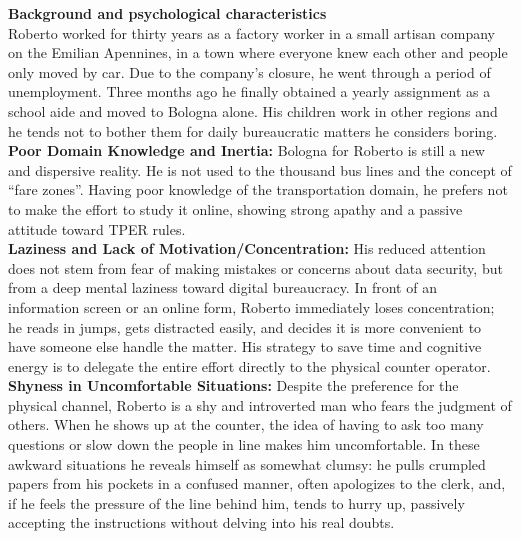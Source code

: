﻿\documentclass[11pt,a4paper]{article}
\begin{document}
\begin{tcolorbox}[base]
    \textbf{Background and psychological characteristics} \\[4pt]
    {\small
    Roberto worked for thirty years as a factory worker in a small artisan company on the Emilian Apennines, in a town where everyone knew each other and people only moved by car. Due to the company's closure, he went through a period of unemployment. Three months ago he finally obtained a yearly assignment as a school aide and moved to Bologna alone. His children work in other regions and he tends not to bother them for daily bureaucratic matters he considers boring. \\[4pt]

    \textbf{Poor Domain Knowledge and Inertia:} Bologna for Roberto is still a new and dispersive reality. He is not used to the thousand bus lines and the concept of ``fare zones''. Having poor knowledge of the transportation domain, he prefers not to make the effort to study it online, showing strong apathy and a passive attitude toward TPER rules. \\[4pt]

    \textbf{Laziness and Lack of Motivation/Concentration:} His reduced attention does not stem from fear of making mistakes or concerns about data security, but from a deep mental laziness toward digital bureaucracy. In front of an information screen or an online form, Roberto immediately loses concentration; he reads in jumps, gets distracted easily, and decides it is more convenient to have someone else handle the matter. His strategy to save time and cognitive energy is to delegate the entire effort directly to the physical counter operator. \\[4pt]

    \textbf{Shyness in Uncomfortable Situations:} Despite the preference for the physical channel, Roberto is a shy and introverted man who fears the judgment of others. When he shows up at the counter, the idea of having to ask too many questions or slow down the people in line makes him uncomfortable. In these awkward situations he reveals himself as somewhat clumsy: he pulls crumpled papers from his pockets in a confused manner, often apologizes to the clerk, and, if he feels the pressure of the line behind him, tends to hurry up, passively accepting the instructions without delving into his real doubts.
    }
\end{tcolorbox}

\vspace{0.3cm}
\end{document}
